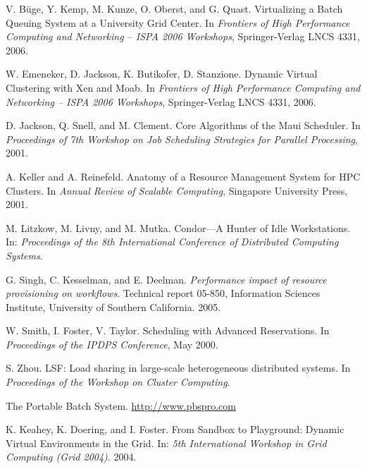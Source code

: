 \documentclass{sigplanconf}
\begin{document}
\begin{thebibliography}{99}

V. B\"uge, Y. Kemp, M. Kunze, O. Oberst, and G. Quast.
Virtualizing a Batch Queuing System at a University Grid Center.
In {\em Frontiers of High Performance Computing and Networking -- ISPA 2006
Workshops}, Springer-Verlag LNCS 4331, 2006.

W. Emeneker, D. Jackson, K. Butikofer, D. Stanzione.
Dynamic Virtual Clustering with Xen and Moab.
In {\em Frontiers of High Performance Computing and Networking -- ISPA 2006
Workshops}, Springer-Verlag LNCS 4331, 2006.


D. Jackson, Q. Snell, and M. Clement.
Core Algorithms of the Maui Scheduler.
In {\em Proceedings of 7th Workshop on Job Scheduling Strategies for Parallel
Processing}, 2001.

A. Keller and A. Reinefeld.
Anatomy of a Resource Management System for HPC Clusters.
In {\em Annual Review of Scalable Computing}, Singapore University Press, 2001.

M. Litzkow, M. Livny, and M. Mutka. 
Condor---A Hunter of Idle Workstations.
In: {\em Proceedings of the 8th International Conference of Distributed
Computing Systems}.

G. Singh, C. Kesselman, and E. Deelman.
{\em Performance impact of resource provisioning on workflows}.
Technical report 05-850, Information Sciences Institute,
University of Southern California. 2005.

W. Smith, I. Foster, V. Taylor.
Scheduling with Advanced Reservations.
In {\em Proceedings of the IPDPS Conference}, May 2000.

S. Zhou.
LSF: Load sharing in large-scale heterogeneous distributed systems.
In {\em Proceedings of the Workshop on Cluster Computing}.

The Portable Batch System. \url{http://www.pbspro.com}

K. Keahey, K. Doering, and I. Foster. From Sandbox to Playground: Dynamic
Virtual
Environments in the Grid. In: {\em 5th International Workshop in Grid Computing
(Grid 2004)}. 2004.


\end{thebibliography}
\end{document}
